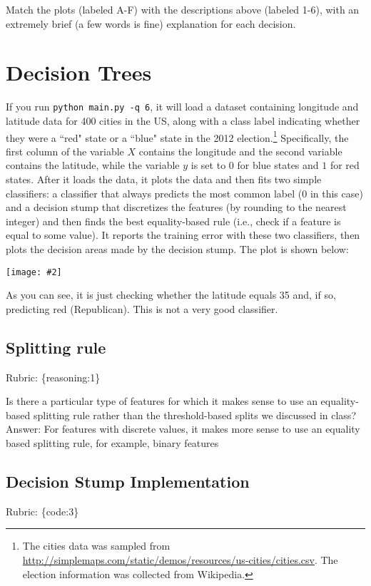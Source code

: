 \documentclass{article}
\def\rubric#1{\gre{Rubric: \{#1\}}}{}
\def\blu#1{{\color{blu}#1}}
\def\gre#1{{\color{gre}#1}}
\newcommand{\centerfig}[2]{\begin{center}\texttt{[image: \#2]}\end{center}}
\def\ans#1{\gre{Answer: #1}}{}
\begin{document}
\blu{Match the plots (labeled A-F) with the descriptions above (labeled 1-6), with an extremely brief (a few words is fine) explanation for each decision.}

\section{Decision Trees}

If you run \texttt{python main.py -q 6}, it will load a dataset containing longitude 
and latitude data for 400 cities in the US, along with a class label indicating
 whether they were a ``red" state or a ``blue" state in the 2012 
 election.\footnote{The cities data was sampled from \url{http://simplemaps.com/static/demos/resources/us-cities/cities.csv}. The election information was collected from Wikipedia.}
Specifically, the first column of the variable $X$ contains the 
longitude and the second variable contains the latitude,
while the variable $y$ is set to $0$ for blue states and $1$ for red states.
After it loads the data, it plots the data and then fits two simple 
classifiers: a classifier that always predicts the
most common label ($0$ in this case) and a decision stump
that discretizes the features (by rounding to the nearest integer)
and then finds the best equality-based rule (i.e., check
 if a feature is equal to some value).
It reports the training error with these two classifiers, then plots the decision areas made by the decision stump.
The plot is shown below:

\centerfig{0.7}{../figs/q6_decisionBoundary}

As you can see, it is just checking whether the latitude equals 35 and, if so, predicting red (Republican).
This is not a very good classifier. 

\subsection{Splitting rule}
\rubric{reasoning:1}

Is there a particular type of features for which it makes sense to use an equality-based splitting rule rather than the threshold-based splits we discussed in class?
\ans{For features with discrete values, it makes more sense to use an equality based splitting rule, for example, binary features}

\subsection{Decision Stump Implementation}
\rubric{code:3}
\end{document}
